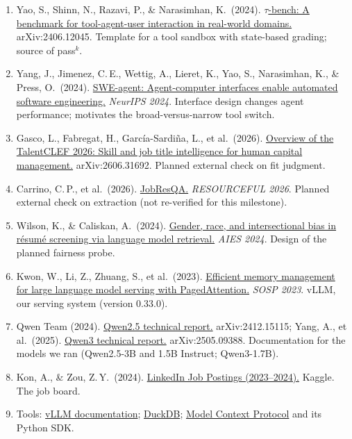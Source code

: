 \documentclass[11pt]{article}
\begin{document}
\begin{enumerate}[leftmargin=*, itemsep=4pt]
  \item Yao, S., Shinn, N., Razavi, P., \& Narasimhan, K.\ (2024). \href{https://arxiv.org/abs/2406.12045}{$\tau$-bench: A benchmark for tool-agent-user interaction in real-world domains.} arXiv:2406.12045. Template for a tool sandbox with state-based grading; source of pass$^k$.
  \item Yang, J., Jimenez, C.\,E., Wettig, A., Lieret, K., Yao, S., Narasimhan, K., \& Press, O.\ (2024). \href{https://arxiv.org/abs/2405.15793}{SWE-agent: Agent-computer interfaces enable automated software engineering.} \textit{NeurIPS 2024}. Interface design changes agent performance; motivates the broad-versus-narrow tool switch.
  \item Gasco, L., Fabregat, H., Garc\'ia-Sardi\~na, L., et al.\ (2026). \href{https://arxiv.org/abs/2606.31692}{Overview of the TalentCLEF 2026: Skill and job title intelligence for human capital management.} arXiv:2606.31692. Planned external check on fit judgment.
  \item Carrino, C.\,P., et al.\ (2026). \href{https://aclanthology.org/2026.resourceful-4.15/}{JobResQA.} \textit{RESOURCEFUL 2026}. Planned external check on extraction (not re-verified for this milestone).
  \item Wilson, K., \& Caliskan, A.\ (2024). \href{https://arxiv.org/abs/2407.20371}{Gender, race, and intersectional bias in r\'esum\'e screening via language model retrieval.} \textit{AIES 2024}. Design of the planned fairness probe.
  \item Kwon, W., Li, Z., Zhuang, S., et al.\ (2023). \href{https://arxiv.org/abs/2309.06180}{Efficient memory management for large language model serving with PagedAttention.} \textit{SOSP 2023}. vLLM, our serving system (version 0.33.0).
  \item Qwen Team (2024). \href{https://arxiv.org/abs/2412.15115}{Qwen2.5 technical report.} arXiv:2412.15115; Yang, A., et al.\ (2025). \href{https://arxiv.org/abs/2505.09388}{Qwen3 technical report.} arXiv:2505.09388. Documentation for the models we ran (Qwen2.5-3B and 1.5B Instruct; Qwen3-1.7B).
  \item Kon, A., \& Zou, Z.\,Y.\ (2024). \href{https://www.kaggle.com/datasets/arshkon/linkedin-job-postings}{LinkedIn Job Postings (2023--2024).} Kaggle. The job board.
  \item Tools: \href{https://docs.vllm.ai}{vLLM documentation}; \href{https://duckdb.org/docs/}{DuckDB}; \href{https://modelcontextprotocol.io}{Model Context Protocol} and its Python SDK.
\end{enumerate}
\end{document}

